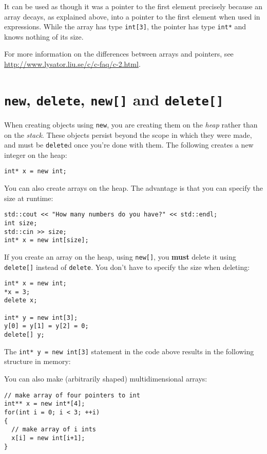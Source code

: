 \documentclass[a4paper]{scrartcl}
\begin{document}
It can be used as though it was a pointer to the first element precisely because an array decays, as explained above, into a pointer to the first element when used in expressions. While the array has type \verb|int[3]|, the pointer has type \verb|int*| and knows nothing of its size.

For more information on the differences between arrays and pointers, see \url{http://www.lysator.liu.se/c/c-faq/c-2.html}.

\section{\texttt{new}, \texttt{delete}, \texttt{new[]} and \texttt{delete[]}}
When creating objects using \verb|new|, you are creating them on the \emph{heap} rather than on the \emph{stack}. These objects persist beyond the scope in which they were made, and must be \verb|delete|d once you're done with them. The following creates a new integer on the heap:
\begin{verbatim}
int* x = new int;
\end{verbatim}

You can also create arrays on the heap. The advantage is that you can specify the size at runtime:
\begin{verbatim}
std::cout << "How many numbers do you have?" << std::endl;
int size;
std::cin >> size;
int* x = new int[size];
\end{verbatim}

If you create an array on the heap, using \verb|new[]|, you \textbf{must} delete it using \verb|delete[]| instead of \verb|delete|. You don't have to specify the size when deleting:
\begin{verbatim}
int* x = new int;
*x = 3;
delete x;

int* y = new int[3];
y[0] = y[1] = y[2] = 0;
delete[] y;
\end{verbatim}

The \verb|int* y = new int[3]| statement in the code above results in the following structure in memory:



You can also make (arbitrarily shaped) multidimensional arrays:
\begin{verbatim}
// make array of four pointers to int
int** x = new int*[4];
for(int i = 0; i < 3; ++i)
{
  // make array of i ints
  x[i] = new int[i+1];
}
\end{verbatim}
\end{document}

